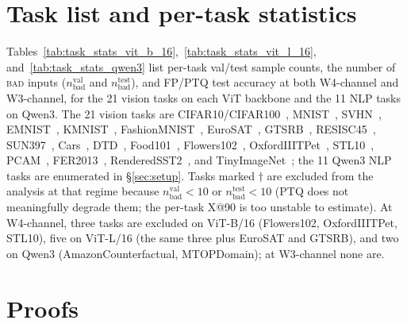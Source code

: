 \documentclass{article}
\newcommand{\bad}{\textsc{bad}\xspace}
\begin{document}



\appendix

\section{Task list and per-task statistics}\label{app:tasks}

Tables~\ref{tab:task_stats_vit_b_16},~\ref{tab:task_stats_vit_l_16}, and~\ref{tab:task_stats_qwen3} list per-task val/test sample counts, the number of \bad{} inputs ($n_{\text{bad}}^{\text{val}}$ and $n_{\text{bad}}^{\text{test}}$), and FP/PTQ test accuracy at both W4-channel and W3-channel, for the 21 vision tasks on each ViT backbone and the 11 NLP tasks on Qwen3. The 21 vision tasks are CIFAR10/CIFAR100~\cite{krizhevsky_learning_nodate}, MNIST~\cite{noauthor_mnist_nodate}, SVHN~\cite{netzer_reading_nodate}, EMNIST~\cite{cohen_emnist_2017}, KMNIST~\cite{clanuwat_deep_2018}, FashionMNIST~\cite{xiao_fashion-mnist_2017}, EuroSAT~\cite{helber_eurosat_2019}, GTSRB~\cite{stallkamp_german_2011}, RESISC45~\cite{cheng_remote_2017}, SUN397~\cite{xiao_sun_2016}, Cars~\cite{krause_3d_2013}, DTD~\cite{cimpoi_describing_2014}, Food101~\cite{bossard_food-101_2014}, Flowers102~\cite{nilsback_automated_2008}, OxfordIIITPet~\cite{parkhi_cats_2012}, STL10~\cite{coates_analysis_2011}, PCAM~\cite{veeling_rotation_2018}, FER2013~\cite{goodfellow_challenges_2013}, RenderedSST2~\cite{socher_recursive_nodate}, and TinyImageNet~\cite{le2015tiny}; the 11 Qwen3 NLP tasks are enumerated in \S\ref{sec:setup}. Tasks marked $\dagger$ are excluded from the analysis at that regime because $n_{\text{bad}}^{\text{val}} < 10$ or $n_{\text{bad}}^{\text{test}} < 10$ (PTQ does not meaningfully degrade them; the per-task X@90 is too unstable to estimate). At W4-channel, three tasks are excluded on ViT-B/16 (Flowers102, OxfordIIITPet, STL10), five on ViT-L/16 (the same three plus EuroSAT and GTSRB), and two on Qwen3 (AmazonCounterfactual, MTOPDomain); at W3-channel none are.





\section{Proofs}\label{app:proofs}
\end{document}
